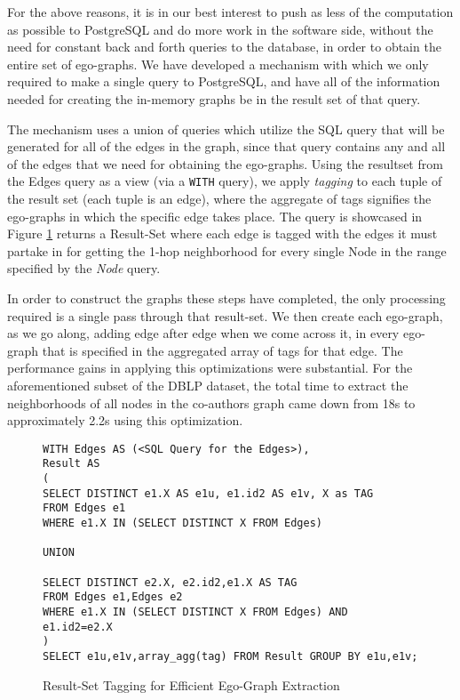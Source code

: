 \documentclass[11pt,letterpaper]{article}
\begin{document}
For the above reasons, it is in our best interest to push as less of the computation as possible to PostgreSQL and do more work in the software side, without the need for constant back and forth queries to the database, in order to obtain the entire set of ego-graphs. We have developed a mechanism with which we only required to make a single query to PostgreSQL, and have all of the information needed for creating the in-memory graphs be in the result set of that query.

The mechanism uses a union of queries which utilize the SQL query that will be generated for all of the edges in the graph, since that query contains any and all of the edges that we need for obtaining the ego-graphs. Using the resultset from the Edges query as a view (via a \texttt{WITH} query), we apply \textit{tagging} to each tuple of the result set (each tuple is an edge), where the aggregate of tags signifies the ego-graphs in which the specific edge takes place. The query is showcased in Figure \ref{fig:tagging} returns a Result-Set where each edge is tagged with the edges it must partake in for getting the 1-hop neighborhood for every single Node in the range specified by the \textit{Node} query.

In order to construct the graphs these steps have completed, the only processing required is a single pass through that result-set. We then create each ego-graph, as we go along, adding edge after edge when we come across it, in every ego-graph that is specified in the aggregated array of tags for that edge. The performance gains in applying this optimizations were substantial. For the aforementioned subset of the DBLP dataset, the total time to extract the neighborhoods of all nodes in the co-authors graph came down from 18s to approximately 2.2s using this optimization.

\begin{figure}[t]
\scriptsize
\begin{lstlisting}[breaklines,basicstyle=\ttfamily]
WITH Edges AS (<SQL Query for the Edges>),
Result AS
(
SELECT DISTINCT e1.X AS e1u, e1.id2 AS e1v, X as TAG
FROM Edges e1
WHERE e1.X IN (SELECT DISTINCT X FROM Edges)

UNION

SELECT DISTINCT e2.X, e2.id2,e1.X AS TAG
FROM Edges e1,Edges e2
WHERE e1.X IN (SELECT DISTINCT X FROM Edges) AND e1.id2=e2.X
)
SELECT e1u,e1v,array_agg(tag) FROM Result GROUP BY e1u,e1v;
\end{lstlisting}
\vspace{-10pt}
\caption{Result-Set Tagging for Efficient Ego-Graph Extraction}
\vspace{-10pt}
\label{fig:tagging}
\end{figure}
\end{document}
